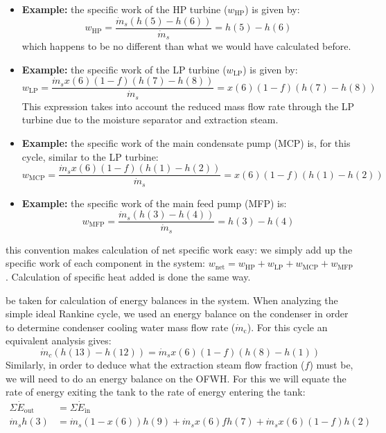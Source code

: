 \begin{itemize}
\item \textbf{Example:} the specific work of the HP turbine ($w_{\text{HP}}$) is given by:
$$ w_{\text{HP}}= \frac{\dot{m}_s(h(5)-h(6))}{\dot{m}_s} = h(5) - h(6)$$
which happens to be no different than what we would have calculated before.

\item \textbf{Example:} the specific work of the LP turbine ($w_{\text{LP}}$) is given by:
$$ w_{\text{LP}}= \frac{\dot{m}_s x(6) (1-f) (h(7) - h(8))}{\dot{m}_s} = x(6) (1-f) (h(7)-h(8))$$
This expression takes into account the reduced mass flow rate through the LP turbine due to the moisture separator and extraction steam.

\item \textbf{Example:} the specific work of the main condensate pump (MCP) is, for this cycle, similar to the LP turbine:
$$ w_{\text{MCP}}=  \frac{\dot{m}_s x(6) (1-f) (h(1)-h(2))}{\dot{m}_s} = x(6)(1-f)(h(1)-h(2))$$

\item \textbf{Example:} the specific work of the main feed pump (MFP) is:
$$ w_{\text{MFP}}= \frac{\dot{m}_s (h(3) - h(4))}{\dot{m}_s}=h(3) - h(4)$$
\end{itemize}

this convention makes calculation of net specific work easy: we simply add up the specific work of each component in the system: $w_{\text{net}} = w_{\text{HP}}+w_{\text{LP}}+w_{\text{MCP}}+w_{\text{MFP}}$.  Calculation of specific heat added is done the same way.

 be taken for calculation of energy balances in the system.  When analyzing the simple ideal Rankine cycle, we used an energy balance on the condenser in order to determine condenser cooling water mass flow rate ($\dot{m}_{\text{c}}$).  For this cycle an equivalent analysis gives:
$$ \dot{m}_c (h(13) - h(12)) = \dot{m}_s x(6)(1-f)(h(8)-h(1))$$
Similarly, in order to deduce what the extraction steam flow fraction ($f$) must be, we will need to do an energy balance on the OFWH.  For this we will equate the rate of energy exiting the tank to the rate of energy entering the tank:
\begin{align*}
\Sigma \dot{E}_{\text{out}} &= \Sigma \dot{E}_{\text{in}} \\
\dot{m}_s h(3) &= \dot{m}_s (1-x(6))h(9) + \dot{m}_s x(6)f h(7) + \dot{m}_s x(6)(1-f)h(2)
\end{align*}


